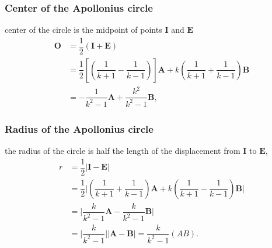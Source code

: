 \documentclass{beamer}
\begin{document}
\begin{frame}
\frametitle{Center of the Apollonius circle}
center of the circle is the midpoint of points $\boldsymbol{I}$ and $\boldsymbol{E}$
\begin{equation}
\begin{split}
\boldsymbol{O} & = \dfrac{1}{2} (\boldsymbol{I}+\boldsymbol{E})\\
& = \dfrac{1}{2} [(\dfrac{1}{k+1}-\dfrac{1}{k-1})]\boldsymbol{A}+k(\dfrac{1}{k+1}+\dfrac{1}{k-1}) \boldsymbol{B}\\
& =-\dfrac{1}{k^{2}-1}\boldsymbol{A} + \dfrac{{k^{2}}}{k^{2}-1} \boldsymbol{B},
\end{split}
\label{eqn:center}
\end{equation}
\end{frame}
\begin{frame}
\frametitle{Radius of the Apollonius circle}
the radius of the circle is half the length of the displacement from $\boldsymbol{I}$ to $\boldsymbol{E}$,
\begin{equation}
\begin{split}
r & =\dfrac{1}{2} \lvert \boldsymbol{I} -\boldsymbol{E}\rvert \\
& = \dfrac{1}{2} \lvert (\dfrac{1}{k+1}+\dfrac{1}{k-1})\boldsymbol{A}+k(\dfrac{1}{k+1}-\dfrac{1}{k-1}) \boldsymbol{B}\rvert \\
& =  \lvert\dfrac{k}{k^{2}-1}\boldsymbol{A} - \dfrac{k}{k^{2}-1} \boldsymbol{B}\rvert\\
& = \lvert\dfrac{k}{k^{2}-1}\rvert \lvert\boldsymbol{A} -\boldsymbol{B}\rvert = \dfrac{k}{k^{2}-1}(AB).
\end{split}
\label{eqn:radius}
\end{equation}
\end{frame}
\end{document}
